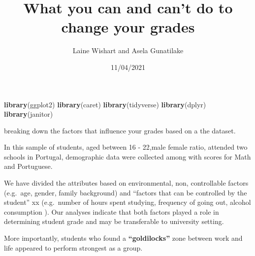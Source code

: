 \documentclass[
]{article}
\title{What you can and can't do to change your grades}
\author{Laine Wishart and Asela Gunatilake}
\date{11/04/2021}
\newenvironment{Shaded}{\begin{snugshade}}{\end{snugshade}}
\newcommand{\CommentTok}[1]{\textcolor[rgb]{0.56,0.35,0.01}{\textit{#1}}}
\newcommand{\DataTypeTok}[1]{\textcolor[rgb]{0.13,0.29,0.53}{#1}}
\newcommand{\KeywordTok}[1]{\textcolor[rgb]{0.13,0.29,0.53}{\textbf{#1}}}
\newcommand{\NormalTok}[1]{#1}
\newcommand{\OperatorTok}[1]{\textcolor[rgb]{0.81,0.36,0.00}{\textbf{#1}}}
\newcommand{\OtherTok}[1]{\textcolor[rgb]{0.56,0.35,0.01}{#1}}
\newcommand{\StringTok}[1]{\textcolor[rgb]{0.31,0.60,0.02}{#1}}
\begin{document}
\maketitle

\begin{Shaded}
\begin{Highlighting}[]
\KeywordTok{library}\NormalTok{(ggplot2)}
\KeywordTok{library}\NormalTok{(caret)}
\KeywordTok{library}\NormalTok{(tidyverse)}
\KeywordTok{library}\NormalTok{(dplyr)}
\KeywordTok{library}\NormalTok{(janitor)}
\end{Highlighting}
\end{Shaded}

\begin{Shaded}
\end{Shaded}

breaking down the factors that influence your grades based on a the
dataset.

In this sample of students, aged between 16 - 22,male female ratio,
attended two schools in Portugal, demographic data were collected among
with scores for Math and Portuguese.

We have divided the attributes based on environmental, non, controllable
factors (e.g.~age, gender, family background) and ``factors that can be
controlled by the student'' xx (e.g.~number of hours spent studying,
frequency of going out, alcohol consumption ). Our analyses indicate
that both factors played a role in determining student grade and may be
transferable to university setting.

More importantly, students who found a \textbf{``goldilocks''} zone
between work and life appeared to perform strongest as a group.
\end{document}
